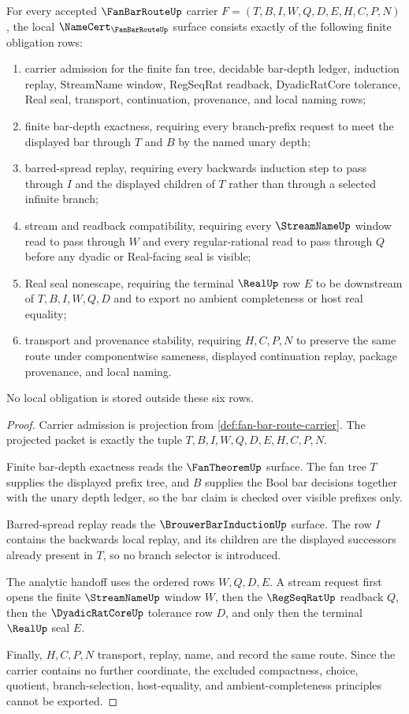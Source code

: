 \begin{theorem}
\label{thm:fan-bar-route-namecert-obligations}
For every accepted $\FanBarRouteUp$ carrier $F=(T,B,I,W,Q,D,E,H,C,P,N)$, the local $\NameCert_{\FanBarRouteUp}$ surface consists exactly of the following finite obligation rows:
\begin{enumerate}
\item carrier admission for the finite fan tree, decidable bar-depth ledger, induction replay, StreamName window, RegSeqRat readback, DyadicRatCore tolerance, Real seal, transport, continuation, provenance, and local naming rows;
\item finite bar-depth exactness, requiring every branch-prefix request to meet the displayed bar through $T$ and $B$ by the named unary depth;
\item barred-spread replay, requiring every backwards induction step to pass through $I$ and the displayed children of $T$ rather than through a selected infinite branch;
\item stream and readback compatibility, requiring every $\StreamNameUp$ window read to pass through $W$ and every regular-rational read to pass through $Q$ before any dyadic or Real-facing seal is visible;
\item Real seal nonescape, requiring the terminal $\RealUp$ row $E$ to be downstream of $T,B,I,W,Q,D$ and to export no ambient completeness or host real equality;
\item transport and provenance stability, requiring $H,C,P,N$ to preserve the same route under componentwise sameness, displayed continuation replay, package provenance, and local naming.
\end{enumerate}
No local obligation is stored outside these six rows.
\end{theorem}
\begin{proof}
Carrier admission is projection from \autoref{def:fan-bar-route-carrier}. The projected packet is exactly the tuple $T,B,I,W,Q,D,E,H,C,P,N$.

Finite bar-depth exactness reads the $\FanTheoremUp$ surface. The fan tree $T$ supplies the displayed prefix tree, and $B$ supplies the Bool bar decisions together with the unary depth ledger, so the bar claim is checked over visible prefixes only.

Barred-spread replay reads the $\BrouwerBarInductionUp$ surface. The row $I$ contains the backwards local replay, and its children are the displayed successors already present in $T$, so no branch selector is introduced.

The analytic handoff uses the ordered rows $W,Q,D,E$. A stream request first opens the finite $\StreamNameUp$ window $W$, then the $\RegSeqRatUp$ readback $Q$, then the $\DyadicRatCoreUp$ tolerance row $D$, and only then the terminal $\RealUp$ seal $E$.

Finally, $H,C,P,N$ transport, replay, name, and record the same route. Since the carrier contains no further coordinate, the excluded compactness, choice, quotient, branch-selection, host-equality, and ambient-completeness principles cannot be exported.
\end{proof}


